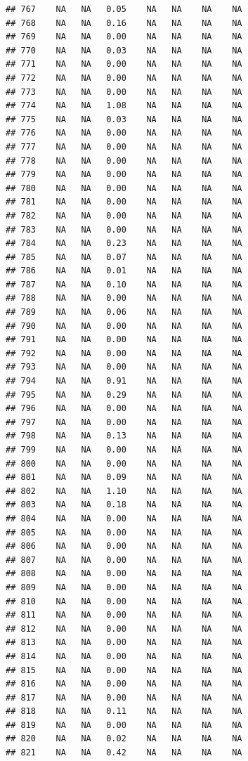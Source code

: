 \documentclass{article}\usepackage{graphicx, color}
\makeatletter
\newenvironment{kframe}{%
 \def\at@end@of@kframe{}%
 \ifinner\ifhmode%
  \def\at@end@of@kframe{\end{minipage}}%
  \begin{minipage}{\columnwidth}%
 \fi\fi%
 \def\FrameCommand##1{\hskip\@totalleftmargin \hskip-\fboxsep
 \colorbox{shadecolor}{##1}\hskip-\fboxsep
     \hskip-\linewidth \hskip-\@totalleftmargin \hskip\columnwidth}%
 \MakeFramed {\advance\hsize-\width
   \@totalleftmargin\z@ \linewidth\hsize
   \@setminipage}}%
 {\par\unskip\endMakeFramed%
 \at@end@of@kframe}
\newenvironment{knitrout}{}{} %
\makeatother
\begin{document}
\begin{knitrout}
\begin{kframe}
\begin{verbatim}
## 767    NA   NA   0.05    NA   NA    NA    NA
## 768    NA   NA   0.16    NA   NA    NA    NA
## 769    NA   NA   0.00    NA   NA    NA    NA
## 770    NA   NA   0.03    NA   NA    NA    NA
## 771    NA   NA   0.00    NA   NA    NA    NA
## 772    NA   NA   0.00    NA   NA    NA    NA
## 773    NA   NA   0.00    NA   NA    NA    NA
## 774    NA   NA   1.08    NA   NA    NA    NA
## 775    NA   NA   0.03    NA   NA    NA    NA
## 776    NA   NA   0.00    NA   NA    NA    NA
## 777    NA   NA   0.00    NA   NA    NA    NA
## 778    NA   NA   0.00    NA   NA    NA    NA
## 779    NA   NA   0.00    NA   NA    NA    NA
## 780    NA   NA   0.00    NA   NA    NA    NA
## 781    NA   NA   0.00    NA   NA    NA    NA
## 782    NA   NA   0.00    NA   NA    NA    NA
## 783    NA   NA   0.00    NA   NA    NA    NA
## 784    NA   NA   0.23    NA   NA    NA    NA
## 785    NA   NA   0.07    NA   NA    NA    NA
## 786    NA   NA   0.01    NA   NA    NA    NA
## 787    NA   NA   0.10    NA   NA    NA    NA
## 788    NA   NA   0.00    NA   NA    NA    NA
## 789    NA   NA   0.06    NA   NA    NA    NA
## 790    NA   NA   0.00    NA   NA    NA    NA
## 791    NA   NA   0.00    NA   NA    NA    NA
## 792    NA   NA   0.00    NA   NA    NA    NA
## 793    NA   NA   0.00    NA   NA    NA    NA
## 794    NA   NA   0.91    NA   NA    NA    NA
## 795    NA   NA   0.29    NA   NA    NA    NA
## 796    NA   NA   0.00    NA   NA    NA    NA
## 797    NA   NA   0.00    NA   NA    NA    NA
## 798    NA   NA   0.13    NA   NA    NA    NA
## 799    NA   NA   0.00    NA   NA    NA    NA
## 800    NA   NA   0.00    NA   NA    NA    NA
## 801    NA   NA   0.09    NA   NA    NA    NA
## 802    NA   NA   1.10    NA   NA    NA    NA
## 803    NA   NA   0.18    NA   NA    NA    NA
## 804    NA   NA   0.00    NA   NA    NA    NA
## 805    NA   NA   0.00    NA   NA    NA    NA
## 806    NA   NA   0.00    NA   NA    NA    NA
## 807    NA   NA   0.00    NA   NA    NA    NA
## 808    NA   NA   0.00    NA   NA    NA    NA
## 809    NA   NA   0.00    NA   NA    NA    NA
## 810    NA   NA   0.00    NA   NA    NA    NA
## 811    NA   NA   0.00    NA   NA    NA    NA
## 812    NA   NA   0.00    NA   NA    NA    NA
## 813    NA   NA   0.00    NA   NA    NA    NA
## 814    NA   NA   0.00    NA   NA    NA    NA
## 815    NA   NA   0.00    NA   NA    NA    NA
## 816    NA   NA   0.00    NA   NA    NA    NA
## 817    NA   NA   0.00    NA   NA    NA    NA
## 818    NA   NA   0.11    NA   NA    NA    NA
## 819    NA   NA   0.00    NA   NA    NA    NA
## 820    NA   NA   0.02    NA   NA    NA    NA
## 821    NA   NA   0.42    NA   NA    NA    NA

\end{verbatim}
\end{kframe}
\end{knitrout}
\end{document}
